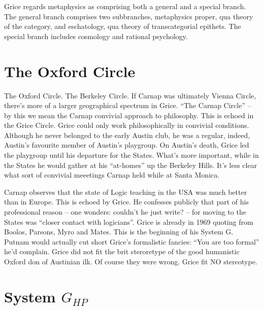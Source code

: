 \documentclass[10pt,titlepage]{book}
\begin{document}
Grice  regards metaphysics as comprising both a general and a special branch.
The general branch comprises two subbranches, metaphysics proper, qua theory of the category, and eschatology, qua theory of transcategorial 
epithets.
The special branch includes cosmology and rational psychology.  

\section{The Oxford Circle}

The  Oxford Circle. The Berkeley Circle.
If Carnap was ultimately Vienna Circle, there’s more of a larger geographical spectrum in Grice.
``The Carnap Circle'' --  by this we mean the Carnap convivial approach to philosophy. 
This is echoed in  the Grice Circle.
Grice could only work philosophically in convivial conditions.
Although he never belonged to the early Austin club, he was a regular, indeed, Austin's favourite member of Austin's playgroup. 
On Austin's death, Grice led the playgroup until his departure for the States.
What's more important, while in the States he would gather at his ``at-homes'' up the Berkeley Hills.
It's less clear what sort of convivial meeetings Carnap held while at Santa Monica. 

Carnap observes that the state of Logic teaching in the USA was much better than in Europe.
This is echoed by Grice.
He confesses publicly that part of his  professional reason -- one wonders: couldn't he just write? -- for moving to the States was ``closer contact with logicians''.
Grice is already in 1969 quoting from Boolos, Parsons, Myro and Mates.
This is the beginning of his System G.
Putnam would actually cut short Grice's formalistic fancies: ``You are too formal'' he'd complain.
Grice did not fit the brit steroretype of the good humanistic Oxford don of Austinian ilk.
Of course they were wrong.
Grice fit NO stereotype.

\section{System $G_{HP}$}
\end{document}

